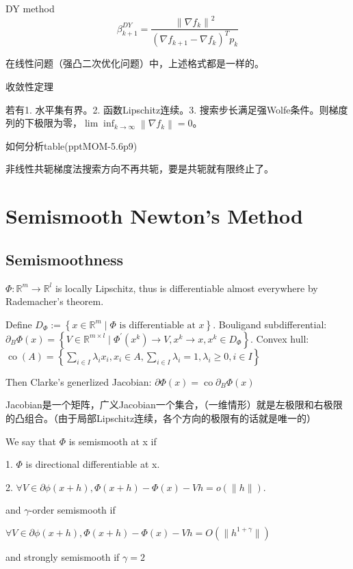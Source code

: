 DY method
\[
  \beta_{k+1}^{D Y}=\frac{\left\|\nabla f_{k}\right\|^{2}}{\left(\nabla f_{k+1}-\nabla f_{k}\right)^{T} p_{k}}
\]

在线性问题（强凸二次优化问题）中，上述格式都是一样的。

收敛性定理

若有1. 水平集有界。2. 函数Lipschitz连续。3. 搜索步长满足强Wolfe条件。则梯度列的下极限为零，$\lim \inf_{k \rightarrow \infty}\left\|\nabla f_{k}\right\|=0$。

如何分析table(pptMOM-5.6p9)

非线性共轭梯度法搜索方向不再共轭，要是共轭就有限终止了。

\section{Semismooth Newton's Method}

\subsection{Semismoothness}

$\Phi: \mathbb{R}^m \to \mathbb{R}^l$ is locally Lipschitz, thus is differentiable almost everywhere by Rademacher’s theorem.

Define $D_{\Phi}:=\left\{x \in \mathbb{R}^{m} \mid \Phi \text { is differentiable at } x\right\}$. Bouligand subdifferential: $\partial_{B} \Phi(x) =  \left\{V \in \mathbb{R}^{m \times l} \mid \Phi^{\prime}\left(x^{k}\right) \to V, x^{k} \to x, x^{k} \in D_{\Phi}\right\}$. Convex hull: $\operatorname{co}(A)=\left\{\sum_{i \in I} \lambda_{i} x_{i}, x_{i} \in A, \sum_{i \in I} \lambda_{i}=1, \lambda_{i} \geq 0, i \in I\right\}$

Then Clarke's generlized Jacobian: $\partial \Phi(x) = \operatorname{co} \partial_B \Phi(x)$

Jacobian是一个矩阵，广义Jacobian一个集合，（一维情形）就是左极限和右极限的凸组合。（由于局部Lipschitz连续，各个方向的极限有的话就是唯一的）

We say that $\Phi$ is semismooth at x if

1. $\Phi$ is directional differentiable at x.

2. $\forall V \in \partial \phi(x+h), \Phi(x+h)-\Phi(x)-V h=o(\|h\|)$.

and $\gamma$-order semismooth if

$\forall V \in \partial \phi(x+h), \Phi(x+h)-\Phi(x)-V h=O(\|h^{1 + \gamma}\|)$

and strongly semismooth if $\gamma = 2$

